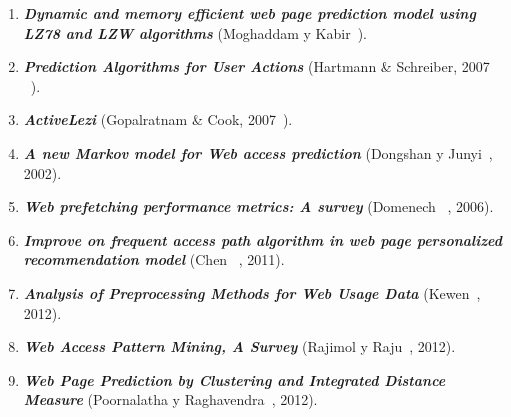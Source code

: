 \vspace{1cm}
\begin{enumerate}

  \item \textbf{\emph{Dynamic and memory efficient web page prediction model using LZ78 and LZW algorithms}} (Moghaddam y Kabir~\cite{Moghaddam2009}). 


  \item \textbf{\emph{Prediction Algorithms for User Actions}} (Hartmann \& Schreiber, 2007  \etal~\cite{hartmann2007}). 
	
	
  \item \textbf{\emph{ActiveLezi}} (Gopalratnam  \& Cook, 2007~\cite{Gopalratnam2007}).  


  \item  \textbf{\emph{A new Markov model for Web access prediction}} (Dongshan y Junyi~\cite{Dongshan2002}, 2002). 
 
 
  \item \textbf{\emph{Web prefetching performance metrics: A survey}} (Domenech \etal~\cite{Domenech2006}, 2006). 
    
 
  \item \textbf{\emph{Improve on frequent access path algorithm in web page personalized recommendation model}} (Chen \etal~\cite{Chen2011}, 2011). 
  

  \item \textbf{\emph{Analysis of Preprocessing Methods for Web Usage Data}} (Kewen~\cite{kewen2012}, 2012). 


  \item \textbf{\emph{Web Access Pattern Mining, A Survey}} (Rajimol y Raju~\cite{Rajimol2012}, 2012). 
  

  \item \textbf{\emph{Web Page Prediction by Clustering and Integrated Distance Measure}} (Poornalatha y Raghavendra~\cite{Poornalatha2012}, 2012). 
  

  
\end{enumerate}




